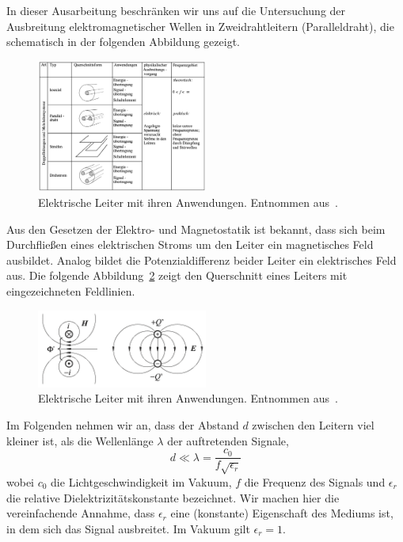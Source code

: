 \documentclass[paper=a4, parskip=half-, ngerman, fontsize=11pt]{scrreprt}
\begin{document}
In dieser Ausarbeitung beschränken wir uns auf die Untersuchung der Ausbreitung elektromagnetischer Wellen in
Zweidrahtleitern (Paralleldraht), die schematisch in der folgenden Abbildung gezeigt.
\begin{figure}[!h]
    \begin{center}
        \includegraphics[width=0.5\textwidth]{images/Leiter.png}
        \caption{Elektrische Leiter mit ihren Anwendungen. Entnommen aus~\cite{FernuniSkript}.}
        \label{Leiter}
    \end{center}
\end{figure}

Aus den Gesetzen der Elektro- und Magnetostatik ist bekannt, dass sich beim Durchfließen eines elektrischen Stroms um
den Leiter ein magnetisches Feld ausbildet. Analog bildet die Potenzialdifferenz beider Leiter ein elektrisches Feld
aus. Die folgende Abbildung~\ref{Felder} zeigt den Querschnitt eines Leiters mit eingezeichneten Feldlinien.

\begin{figure}[!h]
    \begin{center}
        \includegraphics[width=0.5\textwidth]{images/Felder.png}
        \caption{Elektrische Leiter mit ihren Anwendungen. Entnommen aus~\cite{LeitungenUndFilter}.}
        \label{Felder}
    \end{center}
\end{figure}

Im Folgenden nehmen wir an, dass der Abstand $d$ zwischen den Leitern viel kleiner ist, als die Wellenlänge $\lambda$
der auftretenden Signale,
\[ d \ll \lambda = \frac{c_{0}}{f \sqrt{\epsilon_{r}}} \]
wobei $c_{0}$ die Lichtgeschwindigkeit im Vakuum, $f$ die Frequenz des Signals und $\epsilon_{r}$ die relative
Dielektrizitätskonstante bezeichnet. Wir machen hier die vereinfachende Annahme, dass $\epsilon_{r}$ eine (konstante)
Eigenschaft des Mediums ist, in dem sich das Signal ausbreitet. Im Vakuum gilt $\epsilon_{r} = 1$.
\end{document}
